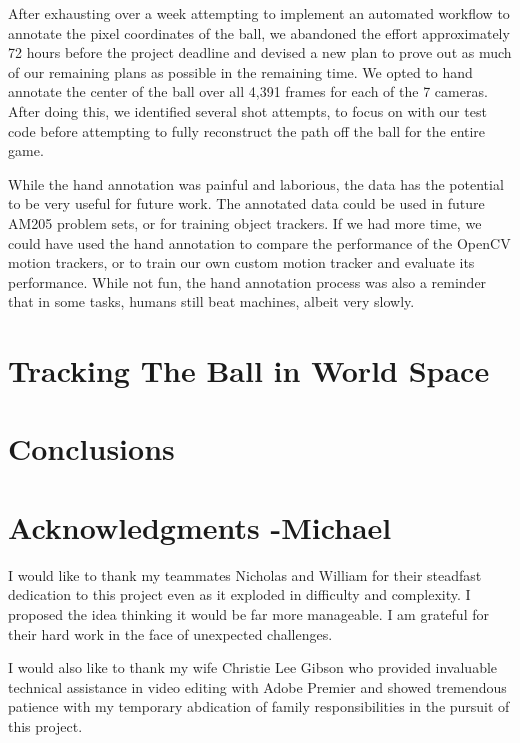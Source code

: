 \documentclass{article}
\begin{document}
After exhausting over a week attempting to implement an automated workflow to 
annotate the pixel coordinates of the ball, we abandoned the effort approximately
72 hours before the project deadline and devised a new plan to prove out as much
of our remaining plans as possible in the remaining time.
We opted to hand annotate the center of the ball over all 4,391 frames for each of the 7 cameras.
After doing this, we identified several shot attempts, to focus on with our test code before attempting to fully reconstruct the path off the ball for the entire game.

While the hand annotation was painful and laborious, the data has the potential to be very useful for future work. 
The annotated data could be used in future AM205 problem sets, or for training object trackers. 
If we had more time, we could have used the hand annotation to compare the performance of the OpenCV motion trackers, 
or to train our own custom motion tracker and evaluate its performance. 
While not fun, the hand annotation process was also a reminder that in some tasks, humans still beat machines, albeit very slowly.

\newpage
\section{Tracking The Ball in World Space}

\newpage
\section{Conclusions}

\section{Acknowledgments -Michael}
I would like to thank my teammates Nicholas and William for their steadfast dedication 
to this project even as it exploded in difficulty and complexity. 
I proposed the idea thinking it would be far more manageable.
I am grateful for their hard work in the face of unexpected challenges.

I would also like to thank my wife Christie Lee Gibson who provided invaluable technical assistance
in video editing with Adobe Premier and showed tremendous patience with my temporary abdication
of family responsibilities in the pursuit of this project.
\end{document}
